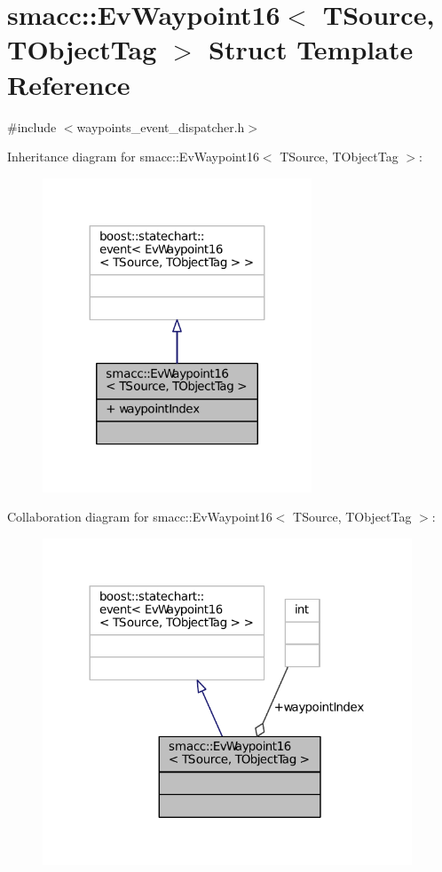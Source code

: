 \hypertarget{structsmacc_1_1EvWaypoint16}{}\section{smacc\+:\+:Ev\+Waypoint16$<$ T\+Source, T\+Object\+Tag $>$ Struct Template Reference}
\label{structsmacc_1_1EvWaypoint16}


{\ttfamily \#include $<$waypoints\+\_\+event\+\_\+dispatcher.\+h$>$}



Inheritance diagram for smacc\+:\+:Ev\+Waypoint16$<$ T\+Source, T\+Object\+Tag $>$\+:
\nopagebreak
\begin{figure}[H]
\begin{center}
\leavevmode
\includegraphics[width=227pt]{structsmacc_1_1EvWaypoint16__inherit__graph}
\end{center}
\end{figure}


Collaboration diagram for smacc\+:\+:Ev\+Waypoint16$<$ T\+Source, T\+Object\+Tag $>$\+:
\nopagebreak
\begin{figure}[H]
\begin{center}
\leavevmode
\includegraphics[width=312pt]{structsmacc_1_1EvWaypoint16__coll__graph}
\end{center}
\end{figure}
